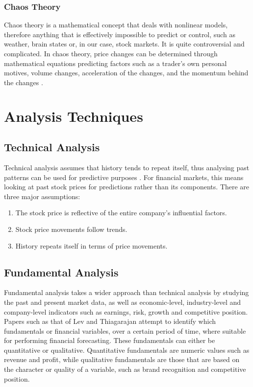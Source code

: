 \documentclass{UoYCSproject}
\begin{document}
\subsubsection{Chaos Theory}
Chaos theory is a mathematical concept that deals with nonlinear models, therefore anything that is effectively impossible to predict or control, such as weather, brain states or, in our case, stock markets. It is quite controversial and complicated. In chaos theory, price changes can be determined through mathematical equations predicting factors such as a trader's own personal motives, volume changes, acceleration of the changes, and the momentum behind the changes \cite{chaostheory}.

\section{Analysis Techniques}
\subsection{Technical Analysis}
Technical analysis assumes that history tends to repeat itself, thus analysing past patterns can be used for predictive purposes \cite{levy1966conceptual}. For financial markets, this means looking at past stock prices for predictions rather than its components. There are three major assumptions:
\begin{enumerate}
    \item The stock price is reflective of the entire company's influential factors.
    \item Stock price movements follow trends.
    \item History repeats itself in terms of price movements.
\end{enumerate}

\subsection{Fundamental Analysis}
Fundamental analysis takes a wider approach than technical analysis by studying the past and present market data, as well as economic-level, industry-level and company-level indicators such as earnings, risk, growth and competitive position. Papers such as that of Lev and Thiagarajan \cite{lev1993fundamental} attempt to identify which fundamentals or financial variables, over a certain period of time, where suitable for performing financial forecasting. These fundamentals can either be quantitative or qualitative. Quantitative fundamentals are numeric values such as revenue and profit, while qualitative fundamentals are those that are based on the character or quality of a variable, such as brand recognition and competitive position. 
\end{document}
